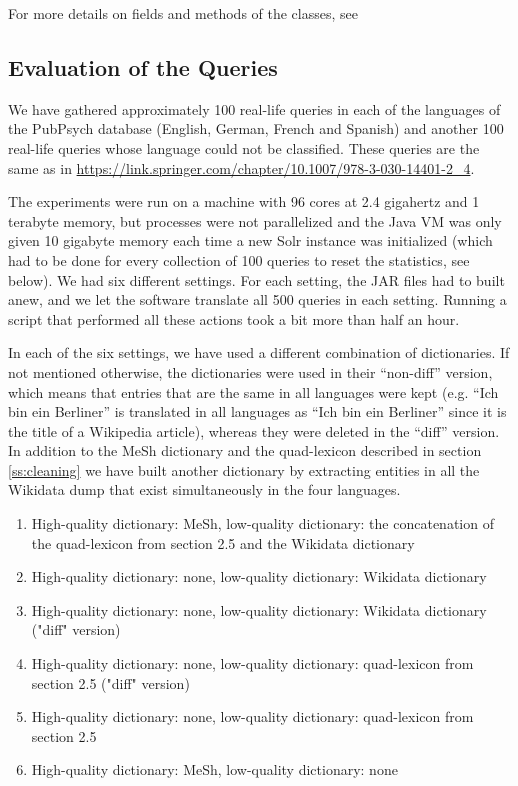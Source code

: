 \documentclass[a4paper,11pt]{article}
\begin{document}
	For more details on fields and methods of the classes, see %
	
	\subsection{Evaluation of the Queries}
	\label{ss:evaluation}
	We have gathered approximately 100 real-life queries in each of the languages of the PubPsych database (English, German, French and Spanish) and another 100 real-life queries whose language could not be classified. These queries are the same as in \url{https://link.springer.com/chapter/10.1007/978-3-030-14401-2_4}.
	
	The experiments were run on a machine with 96 cores at 2.4 gigahertz and 1 terabyte memory, but processes were not parallelized and the Java VM was only given 10 gigabyte memory each time a new Solr instance was initialized (which had to be done for every collection of 100 queries to reset the statistics, see below). We had six different settings. For each setting, the JAR files had to built anew, and we let the software translate all 500 queries in each setting. Running a script that performed all these actions took a bit more than half an hour. 
	
	In each of the six settings, we have used a different combination of dictionaries. If not mentioned otherwise, the dictionaries were used in their ``non-diff'' version, which means that entries that are the same in all languages were kept (e.g. ``Ich bin ein Berliner'' is translated in all languages as ``Ich bin ein Berliner'' since it is the title of a Wikipedia article), whereas they were deleted in the ``diff'' version. In addition to the MeSh dictionary and the quad-lexicon described in section \ref{ss:cleaning} we have built another dictionary by extracting entities in all the Wikidata dump that exist simultaneously in the four languages.
	
	\begin{enumerate}
		\item High-quality dictionary: MeSh, low-quality dictionary: the concatenation of the quad-lexicon from section 2.5 and the Wikidata dictionary
		\item High-quality dictionary: none, low-quality dictionary: Wikidata dictionary
		\item High-quality dictionary: none, low-quality dictionary: Wikidata dictionary ("diff" version)
		\item High-quality dictionary: none, low-quality dictionary: quad-lexicon from section 2.5 ("diff" version)
		\item High-quality dictionary: none, low-quality dictionary: quad-lexicon from section 2.5
		\item High-quality dictionary: MeSh, low-quality dictionary: none
	\end{enumerate}
	
\end{document}
